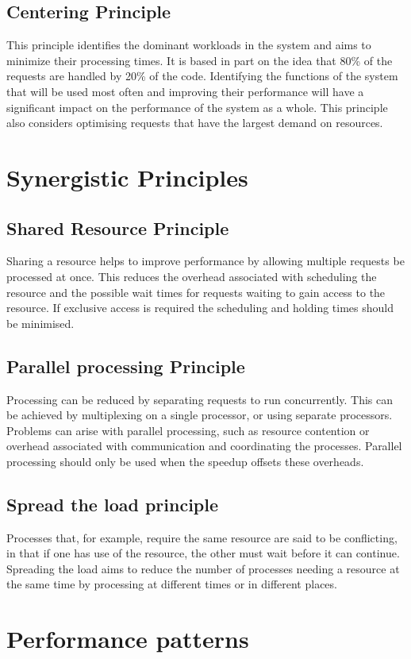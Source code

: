 \documentclass[a4paper,11pt,article,oneside]{memoir}
\begin{document}
	\subsection{Centering Principle}
	This principle identifies the dominant workloads in the system and aims to minimize their processing times. It is based in part on the idea that 80\% of the requests are handled by 20\% of the code. Identifying the functions of the system that will be used most often and improving their performance will have a significant impact on the performance of the system as a whole. This principle also considers optimising requests that have the largest demand on resources. 
	
	\section{Synergistic Principles}
	\subsection{Shared Resource Principle}
	Sharing a resource helps to improve performance by allowing multiple requests be processed at once. This reduces the overhead associated with scheduling the resource and the possible wait times for requests waiting to gain access to the resource. If exclusive access is required the scheduling and holding times should be minimised.
	\subsection{Parallel processing Principle} 
	Processing can be reduced by separating requests to run concurrently. This can be achieved by multiplexing on a single processor, or using separate processors. Problems can arise with parallel processing, such as resource contention or overhead associated with communication and coordinating the processes. Parallel processing should only be used when the speedup offsets these overheads.
	\subsection{Spread the load principle}
	Processes that, for example, require the same resource are said to be conflicting, in that if one has use of the resource, the other must wait before it can continue. Spreading the load aims to reduce the number of processes needing a resource at the same time by processing at different times or in different places. 
	
	\section{Performance patterns}
\end{document}
